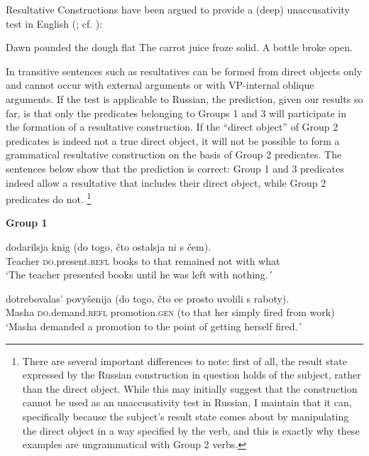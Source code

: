 \documentclass[output=paper,colorlinks,citecolor=brown,nonflat]{./langscibook}
\begin{document}
Resultative Constructions have been argued to provide a (deep) unaccusativity test in English (\citealt{LevinRappaportHovav1995}; cf. \citealt{RappaportHovavLevin2001, Kratzer2005}):


\ea%
    \label{ex:antonyuk:28}
    \ea \label{ex:antonyuk:28a}
    Dawn pounded the dough flat \hfill \citep{Irvin2012}
    \ex \label{ex:antonyuk:28b}
    The carrot juice froze solid.
    \ex \label{ex:antonyuk:28c}
    A bottle broke open.
    \z
\z

In transitive sentences such as  resultatives can be formed from direct objects only and cannot occur with external arguments or with VP-internal oblique arguments. If the test is applicable to Russian, the prediction, given our results so far, is that only the predicates belonging to Groups 1 and 3 will participate in the formation of a resultative construction. If the “direct object” of Group 2 predicates is indeed not a true direct object, it will not be possible to form a grammatical resultative construction on the basis of Group 2 predicates. The sentences below show that the prediction is correct: Group 1 and 3 predicates indeed allow a resultative that includes their direct object, while Group 2 predicates do not. \footnote{There are several important differences to note: first of all, the result state expressed by the Russian construction in question holds of the subject, rather than the direct object. While this may initially suggest that the construction cannot be used as an unaccusativity test in Russian, I maintain that it can, specifically because the subject’s result state comes about by manipulating the direct object in a way specified by the verb, and this is exactly why these examples are ungrammatical with Group 2 verbs.}

\textbf{Group 1}

\ea%
    \label{ex:antonyuk:29}
      {dodarilsja}               {knig}   {(do} {togo,} {čto} {ostalsja}   {ni}   {s}      {čem)}.\\
    Teacher \textsc{do}.present.\textsc{refl} books to  that    {}     remained not with what\\
    \glt `The teacher presented books until he was left with nothing.´
    \z

\ea%
    \label{ex:antonyuk:30}
       {dotrebovalas’}          {povyšenija}        {(do} {togo,} {čto} {ee} {prosto} {uvolili} s raboty).\\
    Masha \textsc{do}.demand.\textsc{refl} promotion.\textsc{gen} (to  that     {}     her simply fired from work)\\
    \glt `Masha demanded a promotion to the point of getting herself fired.´ 
    \z
\end{document}
